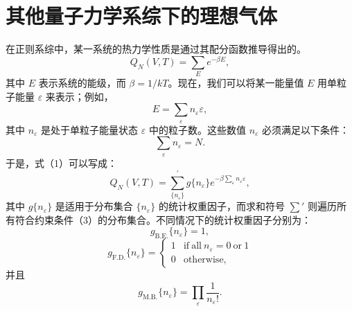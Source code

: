 \section{其他量子力学系综下的理想气体}\label{ux5176ux4ed6ux91cfux5b50ux529bux5b66ux7edfux8ba1ux6001ux4e0bux7684ux7406ux60f3ux6c14ux4f53}
在正则系综中，某一系统的热力学性质是通过其配分函数推导得出的。
\begin{equation}\tag{6.2.1}\label{eq:6.2.1}
Q _ { N } ( V , T ) = \sum _ { E } e ^{- \beta E} ,
\end{equation}
其中 \(E\) 表示系统的能级，而 \(\beta = 1/kT\)。现在，我们可以将某一能量值 \(E\) 用单粒子能量 \(\varepsilon\) 来表示；例如，
\begin{equation}\tag{6.2.2}\label{eq:6.2.2}
E = \sum _ { \varepsilon } n _ { \varepsilon } \varepsilon ,
\end{equation}
其中 \(n_{\varepsilon}\) 是处于单粒子能量状态 \(\varepsilon\) 中的粒子数。这些数值 \(n_{\varepsilon}\) 必须满足以下条件：
\begin{equation}\tag{6.2.3}\label{eq:6.2.3}
\sum _ { \varepsilon } n _ { \varepsilon } = N .
\end{equation}
于是，式（1）可以写成：
\begin{equation}\tag{6.2.4}\label{eq:6.2.4}
Q _ { N } ( V , T ) = \sum _ { \{ n _ { \varepsilon } \} } ^{\prime} g \{ n _ { \varepsilon } \} e ^{- \beta \sum _ { \varepsilon} n _ { \varepsilon } \varepsilon } ,
\end{equation}
其中 \(g\{n_{\varepsilon}\}\) 是适用于分布集合 \(\{n_{\varepsilon}\}\) 的统计权重因子，而求和符号 \(\sum'\) 则遍历所有符合约束条件（3）的分布集合。不同情况下的统计权重因子分别为：
\begin{equation}\tag{6.2.5}\label{eq:6.2.5}
g _ { \mathrm { B . E . } } \{ n _ { \varepsilon } \} = 1 ,
\end{equation}
\begin{equation}\tag{6.2.6}\label{eq:6.2.6}
g _ { \mathrm { F . D . } } \{ n _ { \varepsilon } \} = \left\{ \begin{array}{ll} { 1 } & { \mathrm { i f ~ a l l ~ } n _ { \varepsilon } = 0 \mathrm { ~ o r ~ } 1 } \\{ 0 } & { \mathrm { o t h e r w i s e } , } \end{array} \right.
\end{equation}
并且
\begin{equation}\tag{6.2.7}\label{eq:6.2.7}
g _ { \mathrm { M . B . } } \{ n _ { \varepsilon } \} = \prod _ { \varepsilon } \frac { 1 } { n _ { \varepsilon } ! } .
\end{equation}
